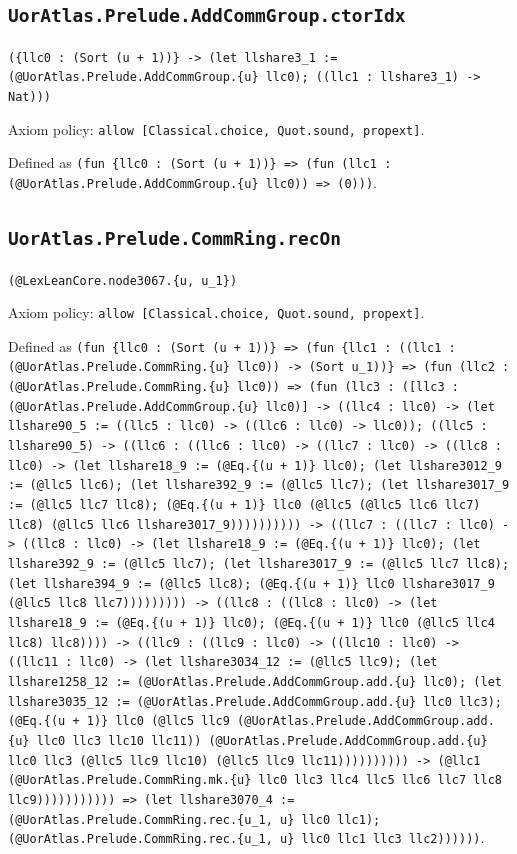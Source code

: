 \documentclass[11pt]{article}
\begin{document}
\subsection*{\texttt{UorAtlas.Prelude.AddCommGroup.ctorIdx}}
\noindent\texttt{(\{llc0 : (Sort (u + 1))\} -> (let llshare3\_1 := (@UorAtlas.Prelude.AddCommGroup.\{u\} llc0); ((llc1 : llshare3\_1) -> Nat)))}\par
\noindent Axiom policy: \texttt{allow [Classical.choice, Quot.sound, propext]}.\par
\noindent Defined as \texttt{(fun \{llc0 : (Sort (u + 1))\} => (fun (llc1 : (@UorAtlas.Prelude.AddCommGroup.\{u\} llc0)) => (0)))}.\par
\subsection*{\texttt{UorAtlas.Prelude.CommRing.recOn}}
\noindent\texttt{(@LexLeanCore.node3067.\{u, u\_1\})}\par
\noindent Axiom policy: \texttt{allow [Classical.choice, Quot.sound, propext]}.\par
\noindent Defined as \texttt{(fun \{llc0 : (Sort (u + 1))\} => (fun \{llc1 : ((llc1 : (@UorAtlas.Prelude.CommRing.\{u\} llc0)) -> (Sort u\_1))\} => (fun (llc2 : (@UorAtlas.Prelude.CommRing.\{u\} llc0)) => (fun (llc3 : ([llc3 : (@UorAtlas.Prelude.AddCommGroup.\{u\} llc0)] -> ((llc4 : llc0) -> (let llshare90\_5 := ((llc5 : llc0) -> ((llc6 : llc0) -> llc0)); ((llc5 : llshare90\_5) -> ((llc6 : ((llc6 : llc0) -> ((llc7 : llc0) -> ((llc8 : llc0) -> (let llshare18\_9 := (@Eq.\{(u + 1)\} llc0); (let llshare3012\_9 := (@llc5 llc6); (let llshare392\_9 := (@llc5 llc7); (let llshare3017\_9 := (@llc5 llc7 llc8); (@Eq.\{(u + 1)\} llc0 (@llc5 (@llc5 llc6 llc7) llc8) (@llc5 llc6 llshare3017\_9)))))))))) -> ((llc7 : ((llc7 : llc0) -> ((llc8 : llc0) -> (let llshare18\_9 := (@Eq.\{(u + 1)\} llc0); (let llshare392\_9 := (@llc5 llc7); (let llshare3017\_9 := (@llc5 llc7 llc8); (let llshare394\_9 := (@llc5 llc8); (@Eq.\{(u + 1)\} llc0 llshare3017\_9 (@llc5 llc8 llc7))))))))) -> ((llc8 : ((llc8 : llc0) -> (let llshare18\_9 := (@Eq.\{(u + 1)\} llc0); (@Eq.\{(u + 1)\} llc0 (@llc5 llc4 llc8) llc8)))) -> ((llc9 : ((llc9 : llc0) -> ((llc10 : llc0) -> ((llc11 : llc0) -> (let llshare3034\_12 := (@llc5 llc9); (let llshare1258\_12 := (@UorAtlas.Prelude.AddCommGroup.add.\{u\} llc0); (let llshare3035\_12 := (@UorAtlas.Prelude.AddCommGroup.add.\{u\} llc0 llc3); (@Eq.\{(u + 1)\} llc0 (@llc5 llc9 (@UorAtlas.Prelude.AddCommGroup.add.\{u\} llc0 llc3 llc10 llc11)) (@UorAtlas.Prelude.AddCommGroup.add.\{u\} llc0 llc3 (@llc5 llc9 llc10) (@llc5 llc9 llc11)))))))))) -> (@llc1 (@UorAtlas.Prelude.CommRing.mk.\{u\} llc0 llc3 llc4 llc5 llc6 llc7 llc8 llc9))))))))))) => (let llshare3070\_4 := (@UorAtlas.Prelude.CommRing.rec.\{u\_1, u\} llc0 llc1); (@UorAtlas.Prelude.CommRing.rec.\{u\_1, u\} llc0 llc1 llc3 llc2))))))}.\par
\end{document}
